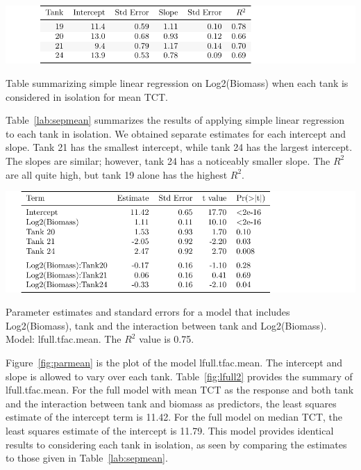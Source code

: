 \begin{table}[H]
\includegraphics{Chapter3Images/meantankspecific.pdf}
\caption{Table summarizing simple linear regression on Log2(Biomass) when each tank is considered in isolation for mean TCT.}
\label{lab:sepmean}
\end{table}


Table~\ref{lab:sepmean} summarizes the results of applying simple linear regression to each tank in isolation. We obtained separate estimates for each intercept and slope. Tank 21 has the smallest intercept, while tank 24 has the largest intercept. The slopes are similar; however, tank 24 has a noticeably smaller slope. The $R^{2}$ are all quite high, but tank 19 alone has the highest $R^{2}$.







\begin{table}[H]
\includegraphics{Chapter3Images/lmMean3.pdf}
\caption{ Parameter estimates and standard errors for a model that includes Log2(Biomass), tank and the interaction between tank and Log2(Biomass). Model:  lfull.tfac.mean. The $R^{2}$ value is 0.75.}
\label{fig:lfull2}
\end{table}


Figure~\ref{fig:parmean} is the plot of the model  lfull.tfac.mean. The intercept and slope is allowed to vary over each tank. Table~\ref{fig:lfull2} provides the summary of  lfull.tfac.mean. For the full model with mean TCT as the response and  both tank and the interaction between tank and biomass as predictors, the least squares estimate of the intercept term is 11.42. For the full model on median TCT, the least squares estimate of the intercept is 11.79. This model provides identical results to considering each tank in isolation, as seen by comparing the estimates to those given in Table~\ref{lab:sepmean}.

